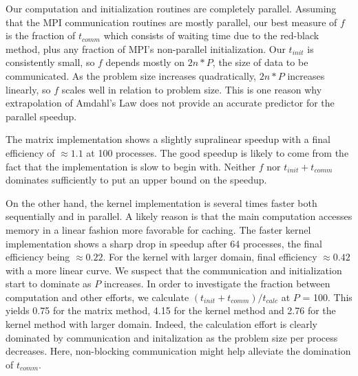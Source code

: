 \documentclass[a4paper,11pt]{article}
\begin{document}

 Our computation and initialization routines are completely parallel. Assuming that the MPI communication routines are mostly parallel, our best measure of $f$ is the fraction of $t_{comm}$ which consists of waiting time due to the red-black method, plus any fraction of MPI's non-parallel initialization. Our $t_{init}$ is consistently small, so $f$ depends mostly on $2n*P$, the size of data to be communicated. As the problem size increases quadratically, $2n*P$ increases linearly, so $f$ scales well in relation to problem size. This is one reason why extrapolation of Amdahl's Law does not provide an accurate predictor for the parallel speedup.

The matrix implementation shows a slightly supralinear speedup with a final efficiency of $\approx1.1$ at 100 processes. The good speedup is likely to come from the fact that the implementation is slow to begin with. Neither $f$ nor $t_{init} + t_{comm}$ dominates sufficiently to put an upper bound on the speedup.

On the other hand, the kernel implementation is several times faster both sequentially and in parallel. A likely reason is that the main computation accesses memory in a linear fashion more favorable for caching. The faster kernel implementation shows a sharp drop in speedup after 64 processes, the final efficiency being $\approx0.22$. For the kernel with larger domain, final efficiency $\approx0.42$ with a more linear curve. We suspect that the communication and initialization start to dominate as $P$ increases. In order to investigate the fraction between computation and other efforts, we calculate $(t_{init}+t_{comm})/t_{calc}$ at $P$ = 100. This yields 0.75 for the matrix method, 4.15 for the kernel method and 2.76 for the kernel method with larger domain. Indeed, the calculation effort is clearly dominated by communication and initalization as the problem size per process decreases. Here, non-blocking communication might help alleviate the domination of $t_{comm}$.
\end{document}
